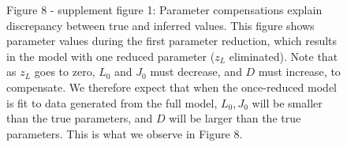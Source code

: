 \documentclass{article}
\newcommand{\zl}{z_L}
\newcommand{\lo}{L_0}
\newcommand{\jo}{J_0}
\begin{document}
\begin{figure}

\vspace{1cm}

        \begin{subfigure}[b]{0.8\linewidth}
    \centering
\end{subfigure}


\captionsetup{labelformat=empty,width=1.1\linewidth}
\caption{Figure 8 - supplement figure 1: Parameter compensations explain discrepancy between true and inferred values.  This figure shows parameter values during the first parameter reduction, which results in the model with one reduced parameter ($\zl$ eliminated).  Note that as $\zl$ goes to zero, $\lo$ and $\jo$ must decrease, and $D$ must increase, to compensate.  We therefore expect that when the once-reduced model is fit to data generated from the full model, $\lo, \jo$ will be smaller than the true parameters, and $D$ will be larger than the true parameters.  This is what we observe in Figure 8. }


\end{figure}
\end{document}
